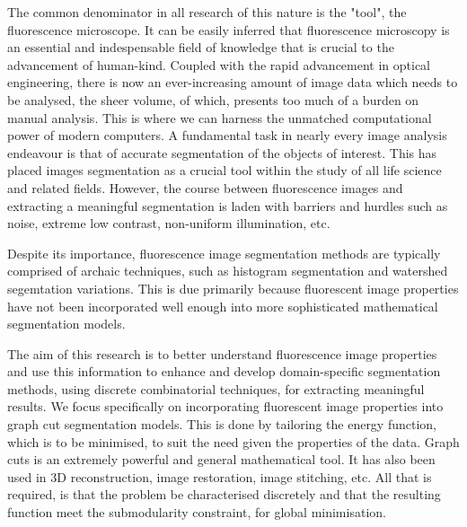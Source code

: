The common denominator in all research of this nature is the "tool", the fluorescence microscope. 
It can be easily inferred that fluorescence microscopy is an essential and indespensable field of knowledge that is crucial to the advancement of human-kind. 
Coupled with the rapid advancement in optical engineering, there is now an ever-increasing amount of image data which needs to be analysed, the sheer volume, of which, presents too much of a burden on manual analysis. 
This is where we can harness the unmatched computational power of modern computers. 
A fundamental task in nearly every image analysis endeavour is that of accurate segmentation of the objects of interest. 
This has placed images segmentation as a crucial tool within the study of all life science and related fields. 
However, the course between fluorescence images and extracting a meaningful segmentation is laden with barriers and hurdles such as noise, extreme low contrast, non-uniform illumination, etc.

Despite its importance, fluorescence image segmentation methods are typically comprised of archaic techniques, such as histogram segmentation and watershed segemtation variations. 
This is due primarily because fluorescent image properties have not been incorporated well enough into more sophisticated mathematical segmentation models. 

The aim of this research is to better understand fluorescence image properties and use this information
to enhance and develop domain-specific segmentation methods, using discrete combinatorial techniques, for extracting meaningful results. 
We focus specifically on incorporating fluorescent image properties into graph cut segmentation models. 
This is done by tailoring the energy function, which is to be minimised, to suit the need given the properties of the data.
Graph cuts is an extremely powerful and general mathematical tool. 
It has also been used in 3D reconstruction, image restoration, image stitching, etc. 
All that is required, is that the problem be characterised discretely and that the resulting function meet the submodularity constraint, for global minimisation.



